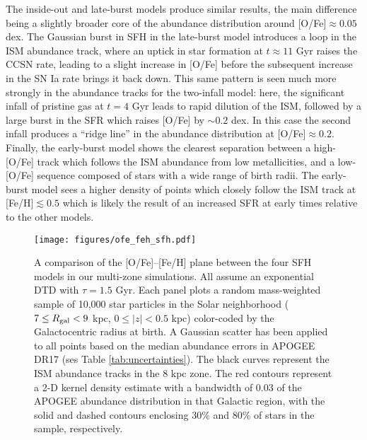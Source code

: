 \documentclass[twocolumn,twocolappendix,linenumbers,trackchanges]{aastex631}
\begin{document}
The inside-out and late-burst models produce similar results, the main difference being a slightly broader core of the abundance distribution around [O/Fe]$\approx0.05$ dex. The Gaussian burst in SFH in the late-burst model introduces a loop in the ISM abundance track, where an uptick in star formation at $t\approx11$ Gyr raises the CCSN rate, leading to a slight increase in [O/Fe] before the subsequent increase in the SN Ia rate brings it back down. This same pattern is seen much more strongly in the abundance tracks for the two-infall model: here, the significant infall of pristine gas at $t=4$ Gyr leads to rapid dilution of the ISM, followed by a large burst in the SFR which raises [O/Fe] by $\sim 0.2$ dex. In this case the second infall produces a ``ridge line'' in the abundance distribution at [O/Fe]$\approx 0.2$. Finally, the early-burst model shows the clearest separation between a high-[O/Fe] track which follows the ISM abundance from low metallicities, and a low-[O/Fe] sequence composed of stars with a wide range of birth radii. The early-burst model sees a higher density of points which closely follow the ISM track at [Fe/H]$\lesssim 0.5$ which is likely the result of an increased SFR at early times relative to the other models.

\begin{figure}
    \centering
    \texttt{[image: figures/ofe\_feh\_sfh.pdf]}
    \caption{A comparison of the [O/Fe]--[Fe/H] plane between the four SFH models in our multi-zone simulations. All assume an exponential DTD with $\tau=1.5$ Gyr. Each panel plots a random mass-weighted sample of 10,000 star particles in the Solar neighborhood ($7\leq R_{\rm gal}<9$ kpc, $0\leq|z|<0.5$ kpc) color-coded by the Galactocentric radius at birth. A Gaussian scatter has been applied to all points based on the median abundance errors in APOGEE DR17 (ses Table \ref{tab:uncertainties}). The black curves represent the ISM abundance tracks in the 8 kpc zone. The red contours represent a 2-D kernel density estimate with a bandwidth of 0.03 of the APOGEE abundance distribution in that Galactic region, with the solid and dashed contours enclosing 30\% and 80\% of stars in the sample, respectively.}
    \label{fig:ofe-feh-sfh}
\end{figure}
\end{document}
